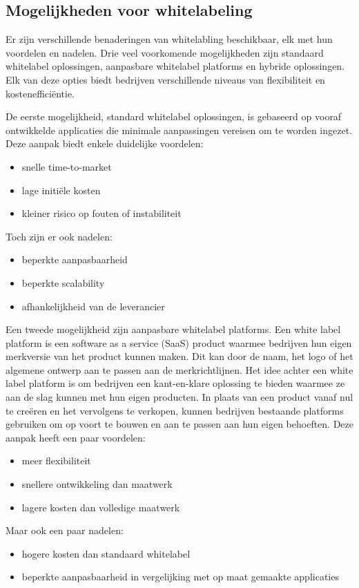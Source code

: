 \subsection{Mogelijkheden voor whitelabeling}
Er zijn verschillende benaderingen van whitelabling beschikbaar, elk met hun voordelen en nadelen. 
Drie veel voorkomende mogelijkheden zijn standaard whitelabel oplossingen, aanpasbare whitelabel platforms en hybride oplossingen. 
Elk van deze opties biedt bedrijven verschillende niveaus van flexibiliteit en kostenefficiëntie.

De eerste mogelijkheid, standard whitelabel oplossingen, is gebaseerd op vooraf ontwikkelde applicaties die minimale aanpassingen vereisen om te worden ingezet. 
Deze aanpak biedt enkele duidelijke voordelen:
\begin{itemize}
  \item snelle time-to-market
  \item lage initiële kosten
  \item kleiner risico op fouten of instabiliteit
\end{itemize}
Toch zijn er ook nadelen:
\begin{itemize}
  \item beperkte aanpasbaarheid
  \item beperkte scalability
  \item afhankelijkheid van de leverancier
\end{itemize}

Een tweede mogelijkheid zijn aanpasbare whitelabel platforms.
Een white label platform is een software as a service (SaaS) product waarmee bedrijven hun eigen merkversie van het product kunnen maken. Dit kan door de naam, het logo of het algemene ontwerp aan te passen aan de merkrichtlijnen.
Het idee achter een white label platform is om bedrijven een kant-en-klare oplossing te bieden waarmee ze aan de slag kunnen met hun eigen producten.
In plaats van een product vanaf nul te creëren en het vervolgens te verkopen, kunnen bedrijven bestaande platforms gebruiken om op voort te bouwen en aan te passen aan hun eigen behoeften.
Deze aanpak heeft een paar voordelen:
\begin{itemize}
  \item meer flexibiliteit
  \item snellere ontwikkeling dan maatwerk
  \item lagere kosten dan volledige maatwerk
\end{itemize}
Maar ook een paar nadelen:
\begin{itemize}
  \item hogere kosten dan standaard whitelabel
  \item beperkte aanpasbaarheid in vergelijking met op maat gemaakte applicaties
\end{itemize}

